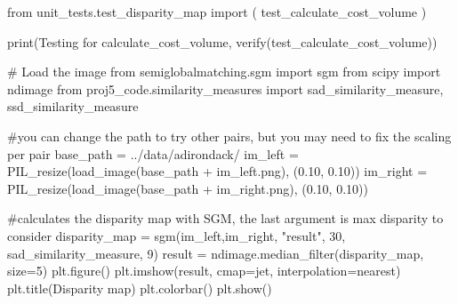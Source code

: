 \documentclass[
  letterpaper,
  DIV=11,
  numbers=noendperiod]{scrartcl}
\newenvironment{Shaded}{\begin{snugshade}}{\end{snugshade}}
\newcommand{\BuiltInTok}[1]{\textcolor[rgb]{0.00,0.23,0.31}{#1}}
\newcommand{\CommentTok}[1]{\textcolor[rgb]{0.37,0.37,0.37}{#1}}
\newcommand{\DecValTok}[1]{\textcolor[rgb]{0.68,0.00,0.00}{#1}}
\newcommand{\FloatTok}[1]{\textcolor[rgb]{0.68,0.00,0.00}{#1}}
\newcommand{\ImportTok}[1]{\textcolor[rgb]{0.00,0.46,0.62}{#1}}
\newcommand{\NormalTok}[1]{\textcolor[rgb]{0.00,0.23,0.31}{#1}}
\newcommand{\OperatorTok}[1]{\textcolor[rgb]{0.37,0.37,0.37}{#1}}
\newcommand{\StringTok}[1]{\textcolor[rgb]{0.13,0.47,0.30}{#1}}
\begin{document}
\begin{Shaded}
\begin{Highlighting}[]
\ImportTok{from}\NormalTok{ unit\_tests.test\_disparity\_map }\ImportTok{import}\NormalTok{ (}
\NormalTok{  test\_calculate\_cost\_volume}
\NormalTok{)}

\BuiltInTok{print}\NormalTok{(}\StringTok{\textquotesingle{}Testing for calculate\_cost\_volume\textquotesingle{}}\NormalTok{, verify(test\_calculate\_cost\_volume))}
\end{Highlighting}
\end{Shaded}

\begin{Shaded}
\begin{Highlighting}[]
\CommentTok{\# Load the image}
\ImportTok{from}\NormalTok{ semiglobalmatching.sgm }\ImportTok{import}\NormalTok{ sgm}
\ImportTok{from}\NormalTok{ scipy }\ImportTok{import}\NormalTok{ ndimage}
\ImportTok{from}\NormalTok{ proj5\_code.similarity\_measures }\ImportTok{import}\NormalTok{ sad\_similarity\_measure, ssd\_similarity\_measure}

\CommentTok{\#you can change the path to try other pairs, but you may need to fix the scaling per pair}
\NormalTok{base\_path }\OperatorTok{=} \StringTok{\textquotesingle{}../data/adirondack/\textquotesingle{}}
\NormalTok{im\_left }\OperatorTok{=}\NormalTok{ PIL\_resize(load\_image(base\_path }\OperatorTok{+} \StringTok{\textquotesingle{}im\_left.png\textquotesingle{}}\NormalTok{), (}\FloatTok{0.10}\NormalTok{, }\FloatTok{0.10}\NormalTok{))}
\NormalTok{im\_right }\OperatorTok{=}\NormalTok{ PIL\_resize(load\_image(base\_path }\OperatorTok{+} \StringTok{\textquotesingle{}im\_right.png\textquotesingle{}}\NormalTok{), (}\FloatTok{0.10}\NormalTok{, }\FloatTok{0.10}\NormalTok{))}

\CommentTok{\#calculates the disparity map with SGM, the last argument is max disparity to consider}
\NormalTok{disparity\_map }\OperatorTok{=}\NormalTok{ sgm(im\_left,im\_right, }\StringTok{"result"}\NormalTok{, }\DecValTok{30}\NormalTok{, sad\_similarity\_measure, }\DecValTok{9}\NormalTok{)}
\NormalTok{result }\OperatorTok{=}\NormalTok{ ndimage.median\_filter(disparity\_map, size}\OperatorTok{=}\DecValTok{5}\NormalTok{)}
\NormalTok{plt.figure()}
\NormalTok{plt.imshow(result, cmap}\OperatorTok{=}\StringTok{\textquotesingle{}jet\textquotesingle{}}\NormalTok{, interpolation}\OperatorTok{=}\StringTok{\textquotesingle{}nearest\textquotesingle{}}\NormalTok{)}
\NormalTok{plt.title(}\StringTok{\textquotesingle{}Disparity map\textquotesingle{}}\NormalTok{)}
\NormalTok{plt.colorbar()}
\NormalTok{plt.show()}
\end{Highlighting}
\end{Shaded}
\end{document}
